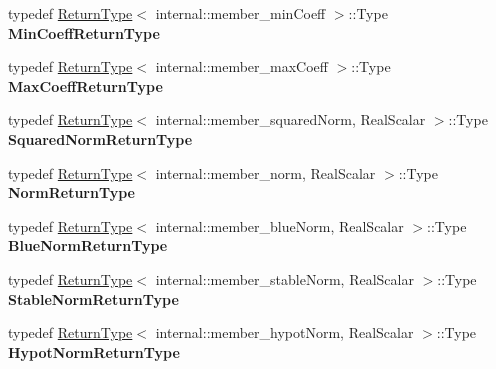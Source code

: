 \begin{DoxyCompactItemize}
typedef \mbox{\hyperlink{struct_eigen_1_1_vectorwise_op_1_1_return_type}{Return\+Type}}$<$ internal\+::member\+\_\+min\+Coeff $>$\+::Type {\bfseries Min\+Coeff\+Return\+Type}
\item 
\mbox{\label{class_eigen_1_1_vectorwise_op_a1370f955f04a91586c742146142917f3}} 
typedef \mbox{\hyperlink{struct_eigen_1_1_vectorwise_op_1_1_return_type}{Return\+Type}}$<$ internal\+::member\+\_\+max\+Coeff $>$\+::Type {\bfseries Max\+Coeff\+Return\+Type}
\item 
\mbox{\label{class_eigen_1_1_vectorwise_op_a67f6c24a812336e281bcf8162d8040d7}} 
typedef \mbox{\hyperlink{struct_eigen_1_1_vectorwise_op_1_1_return_type}{Return\+Type}}$<$ internal\+::member\+\_\+squared\+Norm, Real\+Scalar $>$\+::Type {\bfseries Squared\+Norm\+Return\+Type}
\item 
\mbox{\label{class_eigen_1_1_vectorwise_op_afc93e0b7463d0eb85599d4ce46007fa8}} 
typedef \mbox{\hyperlink{struct_eigen_1_1_vectorwise_op_1_1_return_type}{Return\+Type}}$<$ internal\+::member\+\_\+norm, Real\+Scalar $>$\+::Type {\bfseries Norm\+Return\+Type}
\item 
\mbox{\label{class_eigen_1_1_vectorwise_op_a70c1ca30bae03271321ec5de7e33a867}} 
typedef \mbox{\hyperlink{struct_eigen_1_1_vectorwise_op_1_1_return_type}{Return\+Type}}$<$ internal\+::member\+\_\+blue\+Norm, Real\+Scalar $>$\+::Type {\bfseries Blue\+Norm\+Return\+Type}
\item 
\mbox{\label{class_eigen_1_1_vectorwise_op_a890caf6708ce641e2ecdc08eecb0284e}} 
typedef \mbox{\hyperlink{struct_eigen_1_1_vectorwise_op_1_1_return_type}{Return\+Type}}$<$ internal\+::member\+\_\+stable\+Norm, Real\+Scalar $>$\+::Type {\bfseries Stable\+Norm\+Return\+Type}
\item 
\mbox{\label{class_eigen_1_1_vectorwise_op_a159233a83bb9cdf3653748c0915ea7b2}} 
typedef \mbox{\hyperlink{struct_eigen_1_1_vectorwise_op_1_1_return_type}{Return\+Type}}$<$ internal\+::member\+\_\+hypot\+Norm, Real\+Scalar $>$\+::Type {\bfseries Hypot\+Norm\+Return\+Type}
\item 
\mbox{\label{class_eigen_1_1_vectorwise_op_a97e0cb8e04b09389b8e9bbbb97c44871}} 

\end{DoxyCompactItemize}
